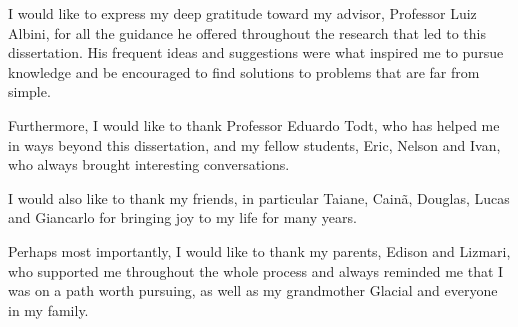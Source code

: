 \begin{agradece}	%


I would like to express my deep gratitude toward my advisor, Professor Luiz Albini, for all the guidance he offered throughout the research that led to this dissertation.
His frequent ideas and suggestions were what inspired me to pursue knowledge and be encouraged to find solutions to problems that are far from simple.

Furthermore, I would like to thank Professor Eduardo Todt, who has helped me in ways beyond this dissertation, and my fellow students, Eric, Nelson and Ivan, who always brought interesting conversations.

I would also like to thank my friends, in particular Taiane, Cainã, Douglas, Lucas and Giancarlo for bringing joy to my life for many years.

Perhaps most importantly, I would like to thank my parents, Edison and Lizmari, who supported me throughout the whole process and always reminded me that I was on a path worth pursuing, as well as my grandmother Glacial and everyone in my family.





\end{agradece}

